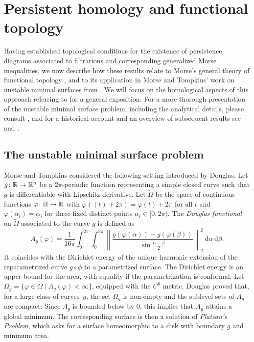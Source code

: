 
\section{Persistent homology and functional topology} \label{s:surfaces}

Having established topological conditions for the existence of persistence diagrams associated to filtrations and corresponding generalized Morse inequalities, we now describe how these results relate to Morse's general theory of functional topology \cite{Morse.1937, Morse.1938, Morse.1940}, and to its application in Morse and Tompkins' work on unstable minimal surfaces from \cite{Morse.1939}.
We will focus on the homological aspects of this approach referring to \cite[Sections 4.3--5]{Bott.1980} for a general exposition.
For a more thorough presentation of the unstable minimal surface problem, including the analytical details, please consult \cite[Section II.6]{Struwe.1988}, and for a historical account and an overview of subsequent results see \cite[Section 6]{Dierkes.2010} and \cite[Section 6.8.1]{Dierkes.2010b}.

\subsection{The unstable minimal surface problem}

Morse and Tompkins considered the following setting introduced by Douglas.
Let $g \colon \mathbb{R} \to \mathbb{R}^n$ be a $2\pi$-periodic function representing a simple closed curve such that $g$ is differentiable with Lipschitz derivative.
Let $\widetilde{\Omega}$ be the space of continuous functions $\varphi \colon \mathbb{R} \to \mathbb{R}$ with $\varphi((t)+2\pi) = \varphi(t) + 2\pi$ for all $t$ and $\varphi(\alpha_i)=\alpha_i$ for three fixed distinct points $\alpha_i \in [0,2\pi)$.
The \emph{Douglas functional} on $\widetilde \Omega$ associated to the curve $g$ is defined as
\begin{equation*}
A_g(\varphi) = \frac{1}{16 \pi} \int_0^{2\pi} \int_0^{2\pi}  \left\| \frac{g(\varphi(\alpha)) - g(\varphi(\beta))}{\sin \frac{\alpha-\beta}{2}} \right\|_2^2 \ \mathrm{d}\alpha \ \mathrm{d}\beta.
\end{equation*}
It coincides with the Dirichlet energy of the unique harmonic extension of the reparametrized curve $g \circ \phi$ to a parametrized surface.
The Dirichlet energy is an upper bound for the area, with equality if the parametrization is conformal.
Let $\Omega_g = \{\varphi \in \widetilde\Omega \mid A_g(\varphi) < \infty\}$, equipped with the $C^0$ metric.
Douglas proved that, for a large class of curves~$g$, the set $\Omega_g$ is non-empty and the sublevel sets of $A_g$ are compact.
Since $A_g$ is bounded below by $0$, this implies that $A_g$ attains a global minimum.
The corresponding surface is then a solution of \emph{Plateau's Problem}, which asks for a surface homeomorphic to a disk with boundary $g$ and minimum area.

